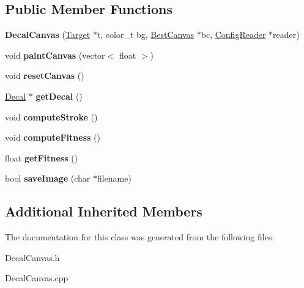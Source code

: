 \subsection*{Public Member Functions}
\begin{DoxyCompactItemize}
\item 
\hypertarget{class_decal_canvas_ad00c8fbce88da1fd173f7da551f7ef95}{{\bfseries Decal\-Canvas} (\hyperlink{class_target}{Target} $\ast$t, color\-\_\-t bg, \hyperlink{class_best_canvas}{Best\-Canvas} $\ast$bc, \hyperlink{class_config_reader}{Config\-Reader} $\ast$reader)}\label{class_decal_canvas_ad00c8fbce88da1fd173f7da551f7ef95}

\item 
\hypertarget{class_decal_canvas_adbf1ef248c1cf7b6ed09abfa1ec05c08}{void {\bfseries paint\-Canvas} (vector$<$ float $>$)}\label{class_decal_canvas_adbf1ef248c1cf7b6ed09abfa1ec05c08}

\item 
\hypertarget{class_decal_canvas_a64baadb9a31c5aa598a45ce402d6d66a}{void {\bfseries reset\-Canvas} ()}\label{class_decal_canvas_a64baadb9a31c5aa598a45ce402d6d66a}

\item 
\hypertarget{class_decal_canvas_a8f122bff9c7696f184b8903dbb295af5}{\hyperlink{class_decal}{Decal} $\ast$ {\bfseries get\-Decal} ()}\label{class_decal_canvas_a8f122bff9c7696f184b8903dbb295af5}

\item 
\hypertarget{class_decal_canvas_aa2d4c9185e12bad6aa590a9f58477063}{void {\bfseries compute\-Stroke} ()}\label{class_decal_canvas_aa2d4c9185e12bad6aa590a9f58477063}

\item 
\hypertarget{class_decal_canvas_a6f9a66f4a1f22e227ef9120410534531}{void {\bfseries compute\-Fitness} ()}\label{class_decal_canvas_a6f9a66f4a1f22e227ef9120410534531}

\item 
\hypertarget{class_decal_canvas_a1e0134f001a92ce161838286fa73ad69}{float {\bfseries get\-Fitness} ()}\label{class_decal_canvas_a1e0134f001a92ce161838286fa73ad69}

\item 
\hypertarget{class_decal_canvas_a7309b13ba847f9efd36f94f50d2238bd}{bool {\bfseries save\-Image} (char $\ast$filename)}\label{class_decal_canvas_a7309b13ba847f9efd36f94f50d2238bd}

\end{DoxyCompactItemize}
\subsection*{Additional Inherited Members}


The documentation for this class was generated from the following files\-:\begin{DoxyCompactItemize}
\item 
Decal\-Canvas.\-h\item 
Decal\-Canvas.\-cpp\end{DoxyCompactItemize}
